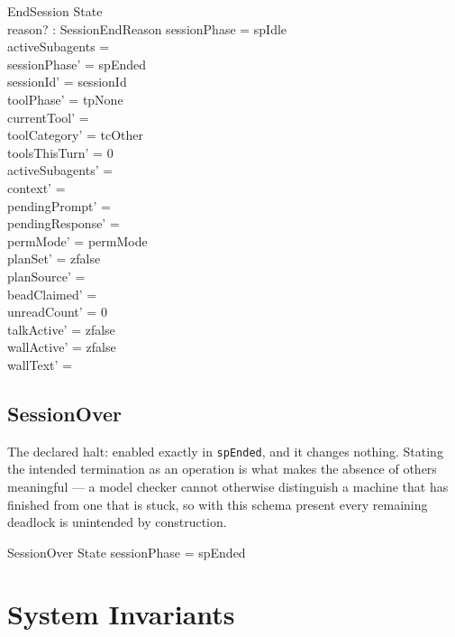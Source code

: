 \documentclass[a4paper,10pt,fleqn]{article}
\begin{document}
\begin{schema}{EndSession}
  \Delta State \\
  reason? : SessionEndReason
  \where
  sessionPhase = spIdle \\
  activeSubagents = \emptyset \\
  sessionPhase' = spEnded \\
  sessionId' = sessionId \\
  toolPhase' = tpNone \\
  currentTool' = \emptyset \\
  toolCategory' = tcOther \\
  toolsThisTurn' = 0 \\
  activeSubagents' = \emptyset \\
  context' = \langle \rangle \\
  pendingPrompt' = \emptyset \\
  pendingResponse' = \emptyset \\
  permMode' = permMode \\
  planSet' = zfalse \\
  planSource' = \emptyset \\
  beadClaimed' = \emptyset \\
  unreadCount' = 0 \\
  talkActive' = zfalse \\
  wallActive' = zfalse \\
  wallText' = \emptyset
\end{schema}

\subsection{SessionOver}

The declared halt: enabled exactly in \texttt{spEnded}, and it changes
nothing. Stating the intended termination as an operation is what makes
the absence of others meaningful --- a model checker cannot otherwise
distinguish a machine that has finished from one that is stuck, so with
this schema present every remaining deadlock is unintended by
construction.

\begin{schema}{SessionOver}
  \Xi State
  \where
  sessionPhase = spEnded
\end{schema}


\section{System Invariants}
\end{document}

